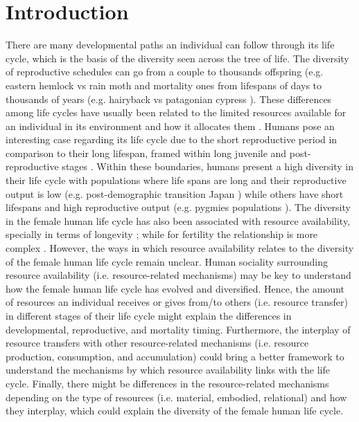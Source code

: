 \documentclass{article}
\begin{document}
\section{Introduction}

There are many developmental paths an individual can follow through its life cycle, which is the basis of the diversity seen across the tree of life. The diversity of reproductive schedules can go from a couple to thousands offspring (e.g. eastern hemlock vs rain moth \citep{tindale1932revision,van2017lifetime} and mortality ones from lifespans of days to thousands of years (e.g. hairyback vs patagonian cypress \citep{balsamo1988life,lara19933620}). These differences among life cycles have usually been related to the limited resources available for an individual in its environment and how it allocates them \citep{stearns2000life}. Humans pose an interesting case regarding its life cycle due to the short reproductive period in comparison to their long lifespan, framed within long juvenile and post-reproductive stages \citep{kaplan2000theory}. Within these boundaries, humans present a high diversity in their life cycle with populations where life spans are long and their reproductive output is low (e.g. post-demographic transition Japan \citep{de2017maximum}) while others have short lifespans and high reproductive output (e.g. pygmies populations \citep{migliano2007life}). The diversity in the female human life cycle has also been associated with resource availability, specially in terms of longevity \citep{kaplan2003embodied}; while for fertility the relationship is more complex \citep{mulder1998demographic,sear2016understanding}. However, the ways in which resource availability relates to the diversity of the female human life cycle remain unclear. Human sociality surrounding resource availability (i.e. resource-related mechanisms) may be key to understand how the female human life cycle has evolved and diversified. Hence, the amount of resources an individual receives or gives from/to others (i.e. resource transfer) in different stages of their life cycle might explain the differences in developmental, reproductive, and mortality timing. Furthermore, the interplay of resource transfers with other resource-related mechanisms (i.e. resource production, consumption, and accumulation) could bring a better framework to understand the mechanisms by which resource availability links with the life cycle. Finally, there might be differences in the resource-related mechanisms depending on the type of resources (i.e. material, embodied, relational) and how they interplay, which could explain the diversity of the female human life cycle.
\end{document}
